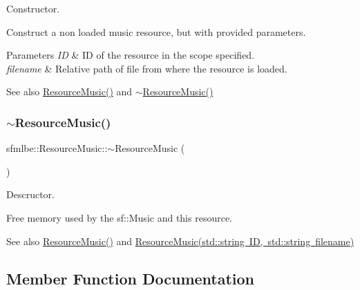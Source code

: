 Constructor. 

Construct a non loaded music resource, but with provided parameters. 
\begin{DoxyParams}{Parameters}
{\em ID} & ID of the resource in the scope specified. \\
\hline
{\em filename} & Relative path of file from where the resource is loaded. \\
\hline
\end{DoxyParams}
\begin{DoxySeeAlso}{See also}
\mbox{\hyperlink{classsfmlbe_1_1_resource_music_a9a20ebb5669632cbc4d85afb6ecf8848}{Resource\+Music()}} and \mbox{\hyperlink{classsfmlbe_1_1_resource_music_a13f5a79c13b15951d855cad9224a1a7b}{$\sim$\+Resource\+Music()}} 
\end{DoxySeeAlso}
\mbox{\label{classsfmlbe_1_1_resource_music_a13f5a79c13b15951d855cad9224a1a7b}} 
\subsubsection{\texorpdfstring{$\sim$\+Resource\+Music()}{~ResourceMusic()}}
{\footnotesize\ttfamily sfmlbe\+::\+Resource\+Music\+::$\sim$\+Resource\+Music (\begin{DoxyParamCaption}{ }\end{DoxyParamCaption})}



Descructor. 

Free memory used by the sf\+::\+Music and this resource. \begin{DoxySeeAlso}{See also}
\mbox{\hyperlink{classsfmlbe_1_1_resource_music_a9a20ebb5669632cbc4d85afb6ecf8848}{Resource\+Music()}} and \mbox{\hyperlink{classsfmlbe_1_1_resource_music_a31e4aa77dd956096604e3b939e3d2075}{Resource\+Music(std\+::string I\+D, std\+::string filename)}} 
\end{DoxySeeAlso}


\subsection{Member Function Documentation}
\mbox{\label{classsfmlbe_1_1_resource_music_a2092277768f71da98fac91d2d37c898c}} 
